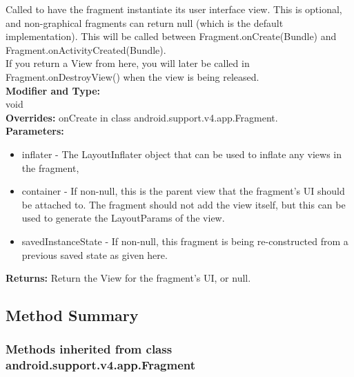 Called to have the fragment instantiate its user interface view. This is optional, and non-graphical fragments can return null (which is the default implementation). This will be called between Fragment.onCreate(Bundle) and Fragment.onActivityCreated(Bundle).\\

If you return a View from here, you will later be called in Fragment.onDestroyView() when the view is being released.\\

\textbf{Modifier and Type:}\\
\tab void\\

\textbf{Overrides:}
\tab    onCreate in class android.support.v4.app.Fragment.\\

\textbf{Parameters:}
\begin{itemize}
\item inflater - The LayoutInflater object that can be used to inflate any views in the fragment,
\item container - If non-null, this is the parent view that the fragment's UI should be attached to. The fragment should not add the view itself, but this can be used to generate the LayoutParams of the view.
\item savedInstanceState - If non-null, this fragment is being re-constructed from a previous saved state as given here.
\end{itemize}

\textbf{Returns:}
\tab   Return the View for the fragment's UI, or null.\\


\subsection{Method Summary}

\subsubsection{Methods inherited from class android.support.v4.app.Fragment}

